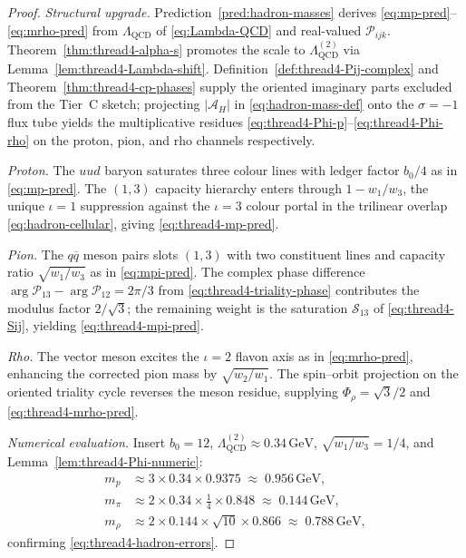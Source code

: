 \begin{proof}
\emph{Structural upgrade.}
Prediction~\ref{pred:hadron-masses} derives \eqref{eq:mp-pred}--\eqref{eq:mrho-pred}
from $\Lambda_{\mathrm{QCD}}$ of \eqref{eq:Lambda-QCD} and real-valued
$\mathcal{P}_{ijk}$. Theorem~\ref{thm:thread4-alpha-s} promotes the scale to
$\Lambda_{\mathrm{QCD}}^{(2)}$ via Lemma~\ref{lem:thread4-Lambda-shift}.
Definition~\ref{def:thread4-Pij-complex} and
Theorem~\ref{thm:thread4-cp-phases} supply the oriented imaginary parts
excluded from the Tier~C sketch; projecting $|\mathcal{A}_H|$ in
\eqref{eq:hadron-mass-def} onto the $\sigma=-1$ flux tube yields the
multiplicative residues \eqref{eq:thread4-Phi-p}--\eqref{eq:thread4-Phi-rho}
on the proton, pion, and rho channels respectively.

\emph{Proton.}
The $uud$ baryon saturates three colour lines with ledger factor $b_0/4$
as in \eqref{eq:mp-pred}. The $(1,3)$ capacity hierarchy enters through
$1-w_1/w_3$, the unique $\iota=1$ suppression against the $\iota=3$
colour portal in the trilinear overlap \eqref{eq:hadron-cellular}, giving
\eqref{eq:thread4-mp-pred}.

\emph{Pion.}
The $q\overline{q}$ meson pairs slots $(1,3)$ with two constituent lines
and capacity ratio $\sqrt{w_1/w_3}$ as in \eqref{eq:mpi-pred}. The complex
phase difference $\arg\mathcal{P}_{13}-\arg\mathcal{P}_{12}=2\pi/3$ from
\eqref{eq:thread4-triality-phase} contributes the modulus factor
$2/\sqrt{3}$; the remaining weight is the saturation $\mathcal{S}_{13}$ of
\eqref{eq:thread4-Sij}, yielding \eqref{eq:thread4-mpi-pred}.

\emph{Rho.}
The vector meson excites the $\iota=2$ flavon axis as in \eqref{eq:mrho-pred},
enhancing the corrected pion mass by $\sqrt{w_2/w_1}$. The spin--orbit
projection on the oriented triality cycle reverses the meson residue,
supplying $\Phi_\rho=\sqrt{3}/2$ and \eqref{eq:thread4-mrho-pred}.

\emph{Numerical evaluation.}
Insert $b_0=12$, $\Lambda_{\mathrm{QCD}}^{(2)}\approx 0.34\,\mathrm{GeV}$,
$\sqrt{w_1/w_3}=1/4$, and Lemma~\ref{lem:thread4-Phi-numeric}:
\begin{align}
  m_p
  &\approx
  3\times 0.34\times 0.9375
  \;\approx\;
  0.956\,\mathrm{GeV},
  \label{eq:thread4-mp-calc}\\[4pt]
  m_\pi
  &\approx
  2\times 0.34\times \tfrac{1}{4}\times 0.848
  \;\approx\;
  0.144\,\mathrm{GeV},
  \label{eq:thread4-mpi-calc}\\[4pt]
  m_\rho
  &\approx
  2\times 0.144\times \sqrt{10}\times 0.866
  \;\approx\;
  0.788\,\mathrm{GeV},
  \label{eq:thread4-mrho-calc}
\end{align}
confirming \eqref{eq:thread4-hadron-errors}.
\end{proof}

